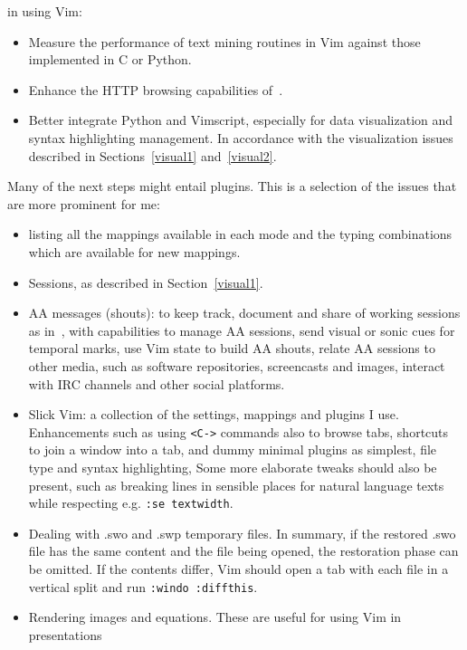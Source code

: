 \documentclass{article}
\newcommand{\ttt}[1] {
	\texttt{<#1>}}
\newcommand{\tttt}[1]{\texttt{#1}}
\begin{document}
 in using Vim:
\begin{itemize}
  \item Measure the performance of text mining routines in Vim against those implemented in C or Python.
  \item Enhance the HTTP browsing capabilities of~\cite{vimrc}.
  \item Better integrate Python and Vimscript, especially for data visualization
    and syntax highlighting management.
    In accordance with the visualization issues described in
    Sections~\ref{visual1} and~\ref{visual2}.
\end{itemize}
\noindent Many of the next steps might entail plugins.
This is a selection of the issues that are more prominent for me:
    \begin{itemize}
      \item listing all the mappings available in each mode and the typing combinations which are available
        for new mappings.
      \item Sessions, as described in Section~\ref{visual1}.
      \item AA messages (shouts): to keep track, document and share of working sessions
        as in~\cite{aa1,aa2}, with capabilities to manage AA sessions,
        send visual or sonic cues for temporal marks, use Vim state to build AA shouts,
        relate AA sessions to other media, such as software repositories,
        screencasts and images, interact with IRC channels and other social platforms.
      \item Slick Vim: a collection of the settings, mappings and plugins I use.
        Enhancements such as using \ttt{C-} commands also to browse tabs,
        shortcuts to join a window into a tab,
        and dummy minimal plugins as simplest, file type and syntax highlighting,
        Some more elaborate tweaks should also be present, such
        as breaking lines in sensible places for natural language texts
        while respecting e.g. \tttt{:se textwidth}.
      \item Dealing with .swo and .swp temporary files.
        In summary, if the restored .swo file has the same content
        and the file being opened,
        the restoration phase can be omitted.
        If the contents differ, Vim should open a tab with each file
        in a vertical split and run \tttt{:windo :diffthis}.
      \item Rendering images and equations.
        These are useful for using Vim in presentations

\end{itemize}
\end{document}
